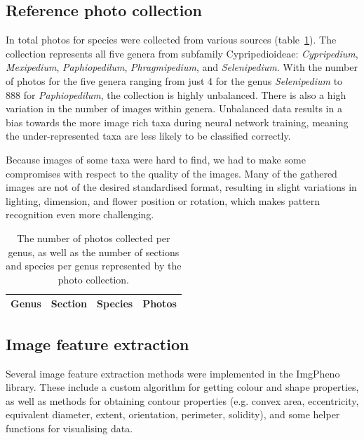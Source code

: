 \documentclass[3p,twocolumn,10pt]{elsarticle}
\begin{document}
\subsection{Reference photo collection}

In total {\PhotoCount} photos for {\SpeciesCount} species were collected from various sources (table~\ref{tbl:photo-counts}). The collection represents all five genera from subfamily Cypripedioideae: \textit{Cypripedium}, \textit{Mexipedium}, \textit{Paphiopedilum}, \textit{Phragmipedium}, and \textit{Selenipedium}. With the number of photos for the five genera ranging from just 4 for the genus \textit{Selenipedium} to 888 for \textit{Paphiopedilum}, the collection is highly unbalanced. There is also a high variation in the number of images within genera. Unbalanced data results in a bias towards the more image rich taxa during neural network training, meaning the under-represented taxa are less likely to be classified correctly.

Because images of some taxa were hard to find, we had to make some compromises with respect to the quality of the images. Many of the gathered images are not of the desired standardised format, resulting in slight variations in lighting, dimension, and flower position or rotation, which makes pattern recognition even more challenging.

\begin{table}[h]\footnotesize
    \caption{The number of photos collected per genus, as well as the number of sections and species per genus represented by the photo collection.}
    \begin{center}
    \begin{tabular}{llll}
    \toprule
    \textbf{Genus} & \textbf{Section} & \textbf{Species} & \textbf{Photos} \\
    \midrule
    
    \bottomrule
    \end{tabular}
    \end{center}
    \label{tbl:photo-counts}
\end{table}

\subsection{Image feature extraction}

Several image feature extraction methods were implemented in the ImgPheno library. These include a custom algorithm for getting colour and shape properties, as well as methods for obtaining contour properties (e.g. convex area, eccentricity, equivalent diameter, extent, orientation, perimeter, solidity), and some helper functions for visualising data.
\end{document}
